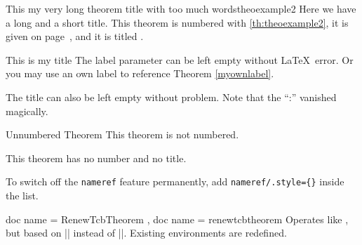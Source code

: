 \begin{docCommands}[
    doc parameter = \oarg{init options}\marg{name}\marg{display name}\marg{options}\marg{prefix},
    doc updated=2022-07-18
    ]
\begin{dispExample}
\begin{mytheo}{This my very long theorem title with
    too much words}{theoexample2}
  Here we have a long and a short title. This theorem is numbered with
  \ref{th:theoexample2}, it is given on page~\pageref{th:theoexample2},
  and it is titled \flqq{}\frqq.
\end{mytheo}
\end{dispExample}

\begin{dispExample}
\begin{mytheo}[label=myownlabel]{This is my title}{}
  The label parameter can be left empty without \LaTeX\ error.
  Or you may use an own label to reference Theorem \ref{myownlabel}.
\end{mytheo}
\end{dispExample}

\begin{dispExample}
\begin{mytheo}{}{}
  The title can also be left empty without problem. Note that the ``:''
  vanished magically.
\end{mytheo}
\end{dispExample}

\begin{dispExample}
\begin{mytheo*}{Unnumbered Theorem}
  This theorem is not numbered.
\end{mytheo*}
\end{dispExample}

\begin{dispExample}
\begin{mytheo*}{}
  This theorem has no number and no title.
\end{mytheo*}
\end{dispExample}

\begin{marker}
To switch off the \texttt{nameref} feature permanently, add
\mbox{\texttt{nameref/.style=\{\}}} inside the  list.
\end{marker}

\end{docCommands}

\medskip

\begin{docCommands}[
    doc parameter = \oarg{init options}\marg{name}\marg{display name}\marg{options}\marg{prefix},
    doc updated=2022-07-18
    ]
    {
      { doc name = RenewTcbTheorem },
      { doc name = renewtcbtheorem }
    }
  Operates like , but based on |\RenewDocumentEnvironment| instead of |\NewDocumentEnvironment|.
  Existing environments are redefined.
\end{docCommands}


